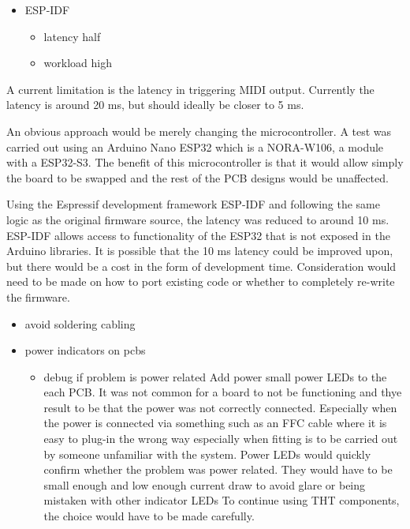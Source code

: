 \begin{itemize}
\item
  ESP-IDF

  \begin{itemize}
  \item
    latency half
  \item
    workload high
  \end{itemize}
\end{itemize}

A current limitation is the latency in triggering MIDI output. Currently
the latency is around 20 ms, but should ideally be closer to 5 ms.

An obvious approach would be merely changing the microcontroller. A test
was carried out using an Arduino Nano ESP32 which is a NORA-W106, a
module with a ESP32-S3. The benefit of this microcontroller is that it
would allow simply the board to be swapped and the rest of the PCB
designs would be unaffected.

Using the Espressif development framework ESP-IDF and following the same
logic as the original firmware source, the latency was reduced to around
10 ms. ESP-IDF allows access to functionality of the ESP32 that is not
exposed in the Arduino libraries. It is possible that the 10 ms latency
could be improved upon, but there would be a cost in the form of
development time. Consideration would need to be made on how to port
existing code or whether to completely re-write the firmware.

\begin{itemize}
\item
  avoid soldering cabling
\item
  power indicators on pcbs

  \begin{itemize}
  \item
    debug if problem is power related Add power small power LEDs to the
    each PCB. It was not common for a board to not be functioning and
    thye result to be that the power was not correctly connected.
    Especially when the power is connected via something such as an FFC
    cable where it is easy to plug-in the wrong way especially when
    fitting is to be carried out by someone unfamiliar with the system.
    Power LEDs would quickly confirm whether the problem was power
    related. They would have to be small enough and low enough current
    draw to avoid glare or being mistaken with other indicator LEDs To
    continue using THT components, the choice would have to be made
    carefully.
  \end{itemize}
\end{itemize}

